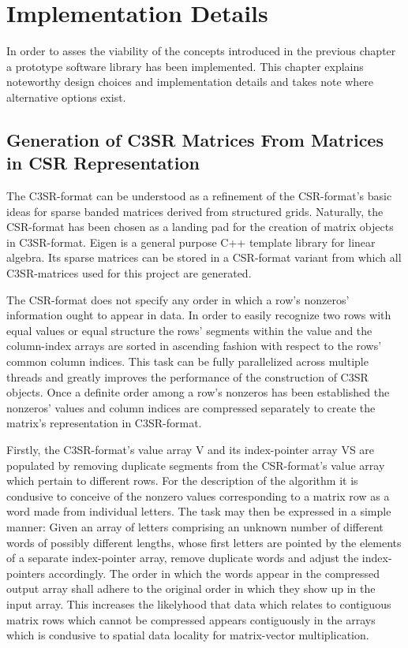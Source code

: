 \def\ApiHubMlf{http://eigen.tuxfamily.org/index.php?title=Main_Page}

\chapter{Implementation Details}

  In order to asses the viability of the concepts introduced in the previous chapter a prototype software library has
  been implemented. This chapter explains noteworthy design choices and implementation details and takes note where
  alternative options exist.

  \section{Generation of C3SR Matrices From Matrices in CSR Representation}

    The C3SR-format can be understood as a refinement of the CSR-format's basic ideas for sparse banded matrices derived
    from structured grids. Naturally, the CSR-format has been chosen as a landing pad for the creation of matrix objects
    in C3SR-format. Eigen \cite{eigen:website} is a general purpose C++ template library for linear algebra. Its sparse
    matrices can be stored in a CSR-format variant from which all C3SR-matrices used for this project are generated.

    The CSR-format does not specify any order in which a row's nonzeros' information ought to appear in data. In order
    to easily recognize two rows with equal values or equal structure the rows' segments within the value and the
    column-index arrays are sorted in ascending fashion with respect to the rows' common column indices. This task can
    be fully parallelized across multiple threads and greatly improves the performance of the construction of C3SR
    objects. Once a definite order among a row's nonzeros has been established the nonzeros' values and column indices
    are compressed separately to create the matrix's representation in C3SR-format.

    Firstly, the C3SR-format's value array V and its index-pointer array VS are populated by removing duplicate segments
    from the CSR-format's value array which pertain to different rows. For the description of the algorithm it is
    condusive to conceive of the nonzero values corresponding to a matrix row as a word made from individual letters.
    The task may then be expressed in a simple manner: Given an array of letters comprising an unknown number of
    different words of possibly different lengths, whose first letters are pointed by the elements of a separate
    index-pointer array, remove duplicate words and adjust the index-pointers accordingly. The order in which the words
    appear in the compressed output array shall adhere to the original order in which they show up in the input array.
    This increases the likelyhood that data which relates to contiguous matrix rows which cannot be compressed appears
    contiguously in the arrays which is condusive to spatial data locality for matrix-vector multiplication.

